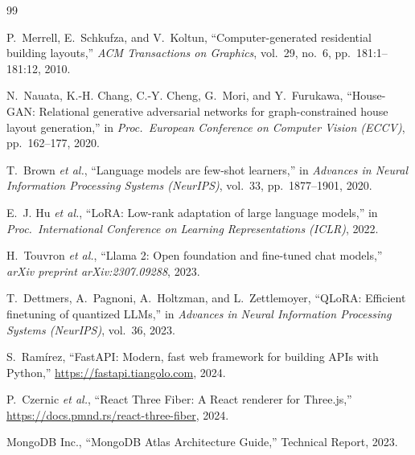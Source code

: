 \documentclass[12pt, a4paper]{article}
\begin{document}
\begin{thebibliography}{99}

P.~Merrell, E.~Schkufza, and V.~Koltun,
``Computer-generated residential building layouts,''
\textit{ACM Transactions on Graphics}, vol.~29, no.~6, pp.~181:1--181:12, 2010.

N.~Nauata, K.-H. Chang, C.-Y. Cheng, G.~Mori, and Y.~Furukawa,
``House-GAN: Relational generative adversarial networks for graph-constrained
house layout generation,''
in \textit{Proc.\ European Conference on Computer Vision (ECCV)},
pp.~162--177, 2020.

T.~Brown \textit{et al.},
``Language models are few-shot learners,''
in \textit{Advances in Neural Information Processing Systems (NeurIPS)},
vol.~33, pp.~1877--1901, 2020.

E.~J. Hu \textit{et al.},
``LoRA: Low-rank adaptation of large language models,''
in \textit{Proc.\ International Conference on Learning Representations (ICLR)},
2022.

H.~Touvron \textit{et al.},
``Llama 2: Open foundation and fine-tuned chat models,''
\textit{arXiv preprint arXiv:2307.09288}, 2023.

T.~Dettmers, A.~Pagnoni, A.~Holtzman, and L.~Zettlemoyer,
``QLoRA: Efficient finetuning of quantized LLMs,''
in \textit{Advances in Neural Information Processing Systems (NeurIPS)},
vol.~36, 2023.

S.~Ram\'irez,
``FastAPI: Modern, fast web framework for building APIs with Python,''
\url{https://fastapi.tiangolo.com}, 2024.

P.~Czernic \textit{et al.},
``React Three Fiber: A React renderer for Three.js,''
\url{https://docs.pmnd.rs/react-three-fiber}, 2024.

MongoDB Inc.,
``MongoDB Atlas Architecture Guide,''
Technical Report, 2023.

\end{thebibliography}
\end{document}
